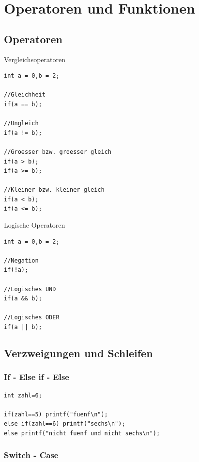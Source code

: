 \documentclass[11pt,a4paper,ngerman, fleqn]{article}
\let\noi\noindent
\begin{document}
\section{Operatoren und Funktionen}
\subsection{Operatoren}
\label{sec:41}


\noi Vergleichsoperatoren

\begin{lstlisting}
int a = 0,b = 2;

//Gleichheit
if(a == b);

//Ungleich
if(a != b);

//Groesser bzw. groesser gleich
if(a > b);
if(a >= b);

//Kleiner bzw. kleiner gleich
if(a < b);
if(a <= b);
\end{lstlisting}

\noi Logische Operatoren

\begin{lstlisting}
int a = 0,b = 2;

//Negation
if(!a);

//Logisches UND
if(a && b);

//Logisches ODER
if(a || b);
\end{lstlisting}


\subsection{Verzweigungen und Schleifen}
\label{sec:42}


\subsubsection{If - Else if - Else}

\begin{lstlisting}
int zahl=6;

if(zahl==5) printf("fuenf\n");
else if(zahl==6) printf("sechs\n");
else printf("nicht fuenf und nicht sechs\n");
\end{lstlisting}

\subsubsection{Switch - Case}
\end{document}
